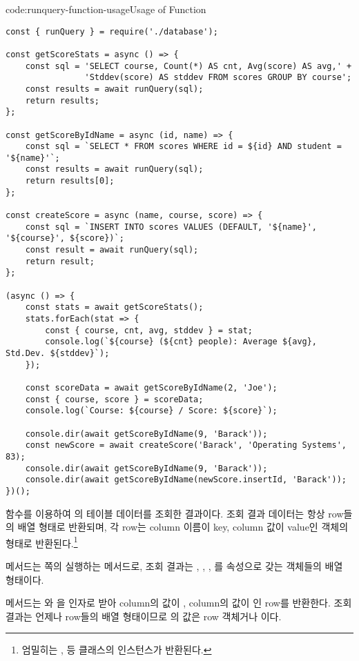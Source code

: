 \begin{codeenv}{code:runquery-function-usage}{Usage of  Function}\begin{verbatim}
const { runQuery } = require('./database');

const getScoreStats = async () => {
    const sql = 'SELECT course, Count(*) AS cnt, Avg(score) AS avg,' +
                'Stddev(score) AS stddev FROM scores GROUP BY course';
    const results = await runQuery(sql);
    return results;
};

const getScoreByIdName = async (id, name) => {
    const sql = `SELECT * FROM scores WHERE id = ${id} AND student = '${name}'`;
    const results = await runQuery(sql);
    return results[0];
};

const createScore = async (name, course, score) => {
    const sql = `INSERT INTO scores VALUES (DEFAULT, '${name}', '${course}', ${score})`;
    const result = await runQuery(sql);
    return result;
};

(async () => {
    const stats = await getScoreStats();
    stats.forEach(stat => {
        const { course, cnt, avg, stddev } = stat;
        console.log(`${course} (${cnt} people): Average ${avg}, Std.Dev. ${stddev}`);
    });

    const scoreData = await getScoreByIdName(2, 'Joe');
    const { course, score } = scoreData;
    console.log(`Course: ${course} / Score: ${score}`);

    console.dir(await getScoreByIdName(9, 'Barack'));
    const newScore = await createScore('Barack', 'Operating Systems', 83);
    console.dir(await getScoreByIdName(9, 'Barack'));
    console.dir(await getScoreByIdName(newScore.insertId, 'Barack'));
})();
\end{verbatim}
\end{codeenv}

\는  함수를 이용하여 의  테이블 데이터를 조회한 결과이다. 조회 결과 데이터는 항상 row들의 배열 형태로 반환되며, 각 row는 column 이름이 key, column 값이 value인 객체의 형태로 반환된다.\footnote{엄밀히는 ,  등 클래스의 인스턴스가 반환된다.}

 메서드는 \pageref{shell:group-by-example}쪽의 \을 실행하는 메서드로, 조회 결과는 , , , 를 속성으로 갖는 객체들의 배열 형태이다.

 메서드는 와 을 인자로 받아  column의 값이 ,  column의 값이 인 row를 반환한다. 조회 결과는 언제나 row들의 배열 형태이므로 의 값은 row 객체거나 이다.

